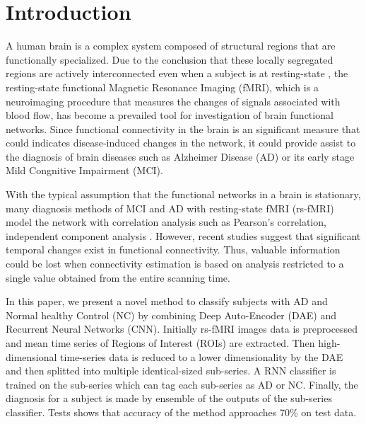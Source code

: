 \section{Introduction}

A human brain is a complex system composed of structural regions that are functionally specialized. Due to the conclusion that these locally segregated regions are actively interconnected even when a subject is at resting-state \cite{biswal95}, the resting-state functional Magnetic Resonance Imaging (fMRI), which is a neuroimaging procedure that measures the changes of signals associated with blood flow, has become a prevailed tool for investigation of brain functional networks. Since functional connectivity in the brain is an significant measure that could indicates disease-induced changes in the network, it could provide assist to the diagnosis of brain diseases such as Alzheimer Disease (AD) or its early stage Mild Congnitive Impairment (MCI).

With the typical assumption that the functional networks in a brain is stationary, many diagnosis methods of MCI and AD with resting-state fMRI (rs-fMRI) model the network with correlation analysis such as Pearson’s correlation, independent component analysis \cite{li12}. However, recent studies \cite{hutch13} suggest that significant temporal changes exist in functional connectivity. Thus, valuable information could be lost when connectivity estimation is based on analysis restricted to a single value obtained from the entire scanning time.

In this paper, we present a novel method to classify subjects with AD and Normal healthy Control (NC) by combining Deep Auto-Encoder (DAE) and Recurrent Neural Networks (CNN). Initially rs-fMRI images data is preprocessed and mean time series of Regions of Interest (ROIs) are extracted. Then high-dimensional time-series data  is reduced to a lower dimensionality by the DAE and then splitted into multiple identical-sized sub-series. A RNN classifier is trained on the sub-series which can tag each sub-series as AD or NC. Finally, the diagnosis for a subject is made by ensemble of the outputs of the sub-series classifier. Tests shows that accuracy of the method approaches 70\% on test data.